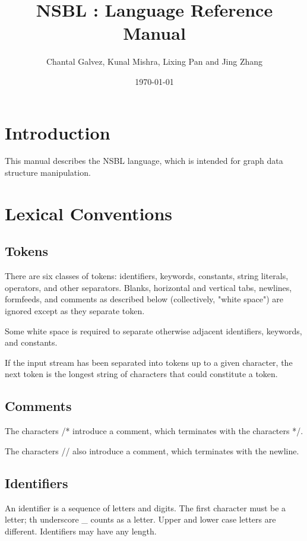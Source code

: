 \documentclass[letterpaper,12pt]{article}
\title {NSBL : Language Reference Manual}
\author {Chantal Galvez, Kunal Mishra, Lixing Pan and Jing Zhang}
\date{\today}
\begin{document}
\maketitle
\section{Introduction}
  This manual describes the NSBL language, which is intended for graph data structure manipulation.

\section{Lexical Conventions}
\subsection{Tokens}
There are six classes of tokens: identifiers, keywords, constants, string literals, operators, and other separators. Blanks, horizontal and vertical tabs, newlines, formfeeds, and comments as described below (collectively, "white space") are ignored except as they separate token. \newline

Some white space is required to separate otherwise adjacent identifiers, keywords, and constants. \newline

If the input stream has been separated into tokens up to a given character, the next token is the longest string of characters that could constitute a token.

\subsection{Comments}
  The characters /* introduce a comment, which terminates with the characters */.\newline

  The characters // also introduce a comment, which terminates with the newline.

\subsection{Identifiers}
An identifier is a sequence of letters and digits. The first character must be a letter; th underscore \_ counts as a letter. Upper and lower case letters are different. Identifiers may have any length.
\end{document}
